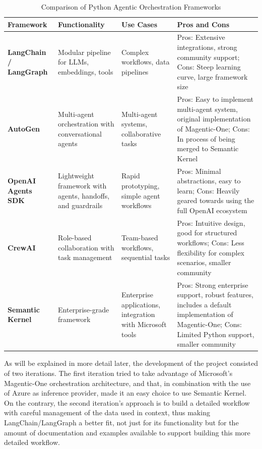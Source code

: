 \documentclass[a4paper]{report}
\begin{document}
\begin{table}[h]
\centering
\begin{tabular}{|p{3cm}|p{3cm}|p{3cm}|p{5.5cm}|}
    \hline
    \textbf{Framework} & \textbf{Functionality} & \textbf{Use Cases} & \textbf{Pros and Cons} \\ \hline
    \textbf{LangChain / LangGraph} & Modular pipeline for LLMs, embeddings, tools & Complex workflows, data pipelines & Pros: Extensive integrations, strong community support; Cons: Steep learning curve, large framework size \\ \hline
    \textbf{AutoGen} & Multi-agent orchestration with conversational agents & Multi-agent systems, collaborative tasks & Pros: Easy to implement multi-agent system, original implementation of Magentic-One; Cons: In process of being merged to Semantic Kernel \\ \hline
    \textbf{OpenAI Agents SDK} & Lightweight framework with agents, handoffs, and guardrails & Rapid prototyping, simple agent workflows & Pros: Minimal abstractions, easy to learn; Cons: Heavily geared towards using the full OpenAI ecosystem \\ \hline
    \textbf{CrewAI} & Role-based collaboration with task management & Team-based workflows, sequential tasks & Pros: Intuitive design, good for structured workflows; Cons: Less flexibility for complex scenarios, smaller community \\ \hline
    \textbf{Semantic Kernel} & Enterprise-grade framework & Enterprise applications, integration with Microsoft tools & Pros: Strong enterprise support, robust features, includes a default implementation of Magentic-One; Cons: Limited Python support, smaller community \\ \hline
\end{tabular}
\caption{Comparison of Python Agentic Orchestration Frameworks}
\label{tab:orchestration_frameworks_uses}
\end{table}

As will be explained in more detail later, the development of the project consisted of two iterations. The first iteration tried to take advantage of Microsoft's Magentic-One orchestration architecture, and that, in combination with the use of Azure as inference provider, made it an easy choice to use Semantic Kernel. On the contrary, the second iteration's approach is to build a detailed workflow with careful management of the data used in context, thus making LangChain/LangGraph a better fit, not just for its functionality but for the amount of documentation and examples available to support building this more detailed workflow.
\end{document}
